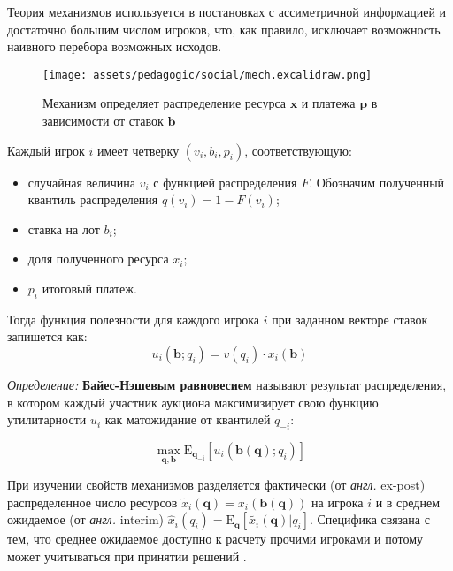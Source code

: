 Теория механизмов используется в постановках с ассиметричной информацией и достаточно большим числом игроков, что, 
как правило, исключает возможность наивного перебора возможных исходов.

\begin{figure}[h]
    \centering
    \texttt{[image: assets/pedagogic/social/mech.excalidraw.png]}
    \caption{Механизм определяет распределение ресурса $\mathbf{x}$ и платежа $\mathbf{p}$ в зависимости от ставок $\mathbf{b}$}
    \label{mech}
\end{figure}

Каждый игрок $i$ имеет четверку $(v_i,b_i,p_i)$, соответствующую:
\begin{itemize}
    \item случайная величина $v_i$ с функцией распределения $F$. Обозначим полученный квантиль распределения $q(v_i) = 1 - F(v_i)$;
    \item ставка на лот $b_i$;
    \item доля полученного ресурса $x_i$;
    \item $p_i$ итоговый платеж.
\end{itemize}

Тогда функция полезности для каждого игрока $i$ при заданном векторе ставок запишется как:
\begin{equation}
    u_i(\mathbf{b};q_i) = v(q_i) \cdot x_i(\mathbf{b})   
\end{equation}

\textit{Определение:} \textbf{Байес-Нэшевым равновесием} называют результат распределения, в котором каждый участник аукциона
максимизирует свою функцию утилитарности $u_i$ как матожидание от квантилей $q_{-i}$:

\begin{equation}
    \max_{\mathbf{q},\mathbf{b}} \mathrm{E}_{\mathbf{q_{-i}}}\left[u_i(\mathbf{b}(\mathbf{q});q_i)\right] 
\end{equation}

При изучении свойств механизмов разделяется фактически (от \textit{англ.} ex-post) распределенное число ресурсов $\tilde{x}_i(\mathbf{q}) = x_i(\mathbf{b}(\mathbf{q}))$
на игрока $i$ и в среднем ожидаемое (от \textit{англ.} interim) $\hat{x}_i(q_i) = \mathrm{E}_\mathbf{q} \left[\tilde{x_i}(\mathbf{q})|q_i\right]$.
Специфика связана с тем, что среднее ожидаемое доступно к расчету прочими игроками и потому может учитываться при принятии решений \cite{bulow1989simple}.

